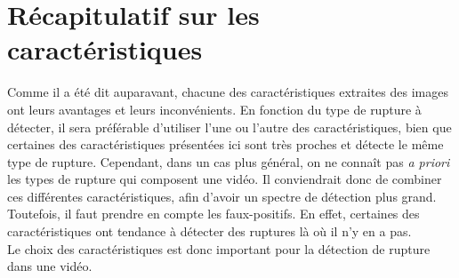 \section{Récapitulatif sur les caractéristiques}

Comme il a été dit auparavant, chacune des caractéristiques extraites des images ont leurs avantages et leurs inconvénients. En fonction du type de rupture à détecter, il sera préférable d'utiliser l'une ou l'autre des caractéristiques, bien que certaines des caractéristiques présentées ici sont très proches et détecte le même type de rupture. Cependant, dans un cas plus général, on ne connaît pas \textit{a priori} les types de rupture qui composent une vidéo. Il conviendrait donc de combiner ces différentes caractéristiques, afin d'avoir un spectre de détection plus grand. Toutefois, il faut prendre en compte les faux-positifs. En effet, certaines des caractéristiques ont tendance à détecter des ruptures là où il n'y en a pas.\\

Le choix des caractéristiques est donc important pour la détection de rupture dans une vidéo.